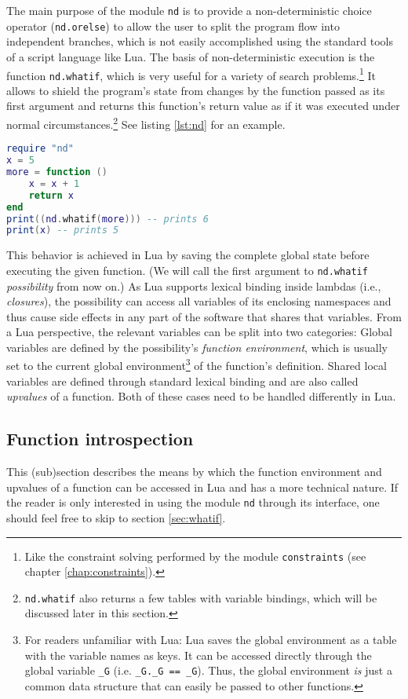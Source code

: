The main purpose of the module \texttt{nd} is to provide a non-deterministic choice operator (\texttt{nd.orelse}) to allow the user to split the program flow into independent branches, which is not easily accomplished using the standard tools of a script language like Lua. The basis of non-deterministic execution is the function \texttt{nd.whatif}, which is very useful for a variety of search problems.\footnote{Like the constraint solving performed by the module \texttt{constraints} (see chapter \ref{chap:constraints}).} It allows to shield the program's state from changes by the function passed as its first argument and returns this function's return value as if it was executed under normal circumstances.\footnote{\texttt{nd.whatif} also returns a few tables with variable bindings, which will be discussed later in this section.} See listing \ref{lst:nd} for an example.

\begin{lstlisting}[language=lua, caption={Preventing global changes with \texttt{nd.whatif}}, label=lst:nd, name=lst:nd]
require "nd"
x = 5
more = function ()
	x = x + 1
	return x
end
print((nd.whatif(more))) -- prints 6
print(x) -- prints 5
\end{lstlisting}

This behavior is achieved in Lua by saving the complete global state before executing the given function. (We will call the first argument to \texttt{nd.whatif} \emph{possibility} from now on.) As Lua supports lexical binding inside lambdas (i.e., \emph{closures}), the possibility can access all variables of its enclosing namespaces and thus cause side effects in any part of the software that shares that variables. From a Lua perspective, the relevant variables can be split into two categories: Global variables are defined by the possibility's \emph{function environment}, which is usually set to the current global environment\footnote{For readers unfamiliar with Lua: Lua saves the global environment as a table with the variable names as keys. It can be accessed directly through the global variable \texttt{\_G} (i.e. \texttt{\_G.\_G == \_G}). Thus, the global environment \emph{is} just a common data structure that can easily be passed to other functions.} of the function's definition. Shared local variables are defined through standard lexical binding and are also called \emph{upvalues} of a function. Both of these cases need to be handled differently in Lua.

\subsection{Function introspection}
This (sub)section describes the means by which the function environment and upvalues of a function can be accessed in Lua and has a more technical nature. If the reader is only interested in using the module \texttt{nd} through its interface, one should feel free to skip to section \ref{sec:whatif}.

